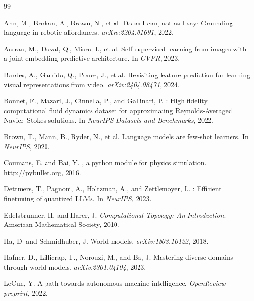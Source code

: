 \documentclass[10pt,twocolumn]{article}
\begin{document}
\begin{thebibliography}{99}
\small

Ahn, M., Brohan, A., Brown, N., et al.
\newblock Do as I can, not as I say: Grounding language in robotic affordances.
\newblock \emph{arXiv:2204.01691}, 2022.

Assran, M., Duval, Q., Misra, I., et al.
\newblock Self-supervised learning from images with a joint-embedding predictive architecture.
\newblock In \emph{CVPR}, 2023.

Bardes, A., Garrido, Q., Ponce, J., et al.
\newblock Revisiting feature prediction for learning visual representations from video.
\newblock \emph{arXiv:2404.08471}, 2024.

Bonnet, F., Mazari, J., Cinnella, P., and Gallinari, P.
: High fidelity computational fluid dynamics dataset for approximating
  Reynolds-Averaged Navier--Stokes solutions.
\newblock In \emph{NeurIPS Datasets and Benchmarks}, 2022.

Brown, T., Mann, B., Ryder, N., et al.
\newblock Language models are few-shot learners.
\newblock In \emph{NeurIPS}, 2020.

Coumans, E. and Bai, Y.
, a python module for physics simulation.
\newblock \url{http://pybullet.org}, 2016.

Dettmers, T., Pagnoni, A., Holtzman, A., and Zettlemoyer, L.
: Efficient finetuning of quantized {LLM}s.
\newblock In \emph{NeurIPS}, 2023.

Edelsbrunner, H. and Harer, J.
\newblock \emph{Computational Topology: An Introduction}.
\newblock American Mathematical Society, 2010.

Ha, D. and Schmidhuber, J.
\newblock World models.
\newblock \emph{arXiv:1803.10122}, 2018.

Hafner, D., Lillicrap, T., Norouzi, M., and Ba, J.
\newblock Mastering diverse domains through world models.
\newblock \emph{arXiv:2301.04104}, 2023.

LeCun, Y.
\newblock A path towards autonomous machine intelligence.
\newblock \emph{OpenReview preprint}, 2022.


\end{thebibliography}
\end{document}
